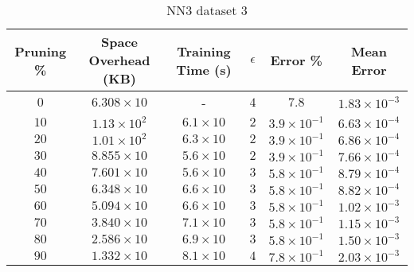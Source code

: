 \begin{adjustwidth}{0cm}{}
\begin{table}
\caption{NN3 dataset 3}\label{pr33}
\begin{tabular}{cccccc}
\hline
\toprule
Pruning \% & Space Overhead (KB) & Training Time (s) & $\epsilon$ & Error \% & Mean Error\\
\midrule
$0$ & $6.308 \times 10$ & - & $4$ & $7.8$ & $1.83 \times 10^{-3}$\\
$10$ & $1.13 \times 10^2 $ & $6.1 \times 10$ & $2$ & $3.9 \times 10^{-1}$ & $6.63 \times 10^{-4}$\\
$20$ & $1.01 \times 10^2 $ & $6.3 \times 10$ & $2$ & $3.9 \times 10^{-1}$ & $6.86 \times 10^{-4}$\\
$30$ & $8.855 \times 10$ & $5.6 \times 10$ & $2$ & $3.9 \times 10^{-1}$ & $7.66 \times 10^{-4}$\\
$40$ & $7.601 \times 10$ & $5.6 \times 10$ & $3$ & $5.8 \times 10^{-1}$ & $8.79 \times 10^{-4}$\\
$50$ & $6.348 \times 10$ & $6.6 \times 10$ & $3$ & $5.8 \times 10^{-1}$ & $8.82 \times 10^{-4}$\\
$60$ & $5.094 \times 10$ & $6.6 \times 10$ & $3$ & $5.8 \times 10^{-1}$ & $1.02 \times 10^{-3}$\\
$70$ & $3.840 \times 10$ & $7.1 \times 10$ & $3$ & $5.8 \times 10^{-1}$ & $1.15 \times 10^{-3}$\\
$80$ & $2.586 \times 10$ & $6.9 \times 10$ & $3$ & $5.8 \times 10^{-1}$ & $1.50 \times 10^{-3}$\\
$90$ & $1.332 \times 10$ & $8.1 \times 10$ & $4$ & $7.8 \times 10^{-1}$ & $2.03 \times 10^{-3}$\\
\bottomrule
\end{tabular}
\end{table}
\end{adjustwidth}

\null\par\null

